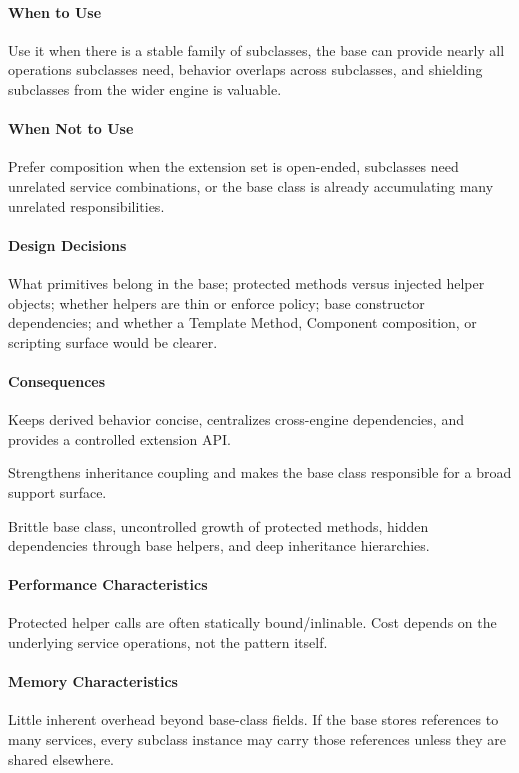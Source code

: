 \documentclass[11pt]{article}
\begin{document}
\paragraph{When to Use} Use it when there is a stable family of subclasses, the base can provide nearly all operations subclasses need, behavior overlaps across subclasses, and shielding subclasses from the wider engine is valuable.
\paragraph{When Not to Use} Prefer composition when the extension set is open-ended, subclasses need unrelated service combinations, or the base class is already accumulating many unrelated responsibilities.
\paragraph{Design Decisions} What primitives belong in the base; protected methods versus injected helper objects; whether helpers are thin or enforce policy; base constructor dependencies; and whether a Template Method, Component composition, or scripting surface would be clearer.
\paragraph{Consequences}
\begin{description}[leftmargin=2.7cm,style=nextline]
\item[Benefits] Keeps derived behavior concise, centralizes cross-engine dependencies, and provides a controlled extension API.
\item[Costs] Strengthens inheritance coupling and makes the base class responsible for a broad support surface.
\item[Risks] Brittle base class, uncontrolled growth of protected methods, hidden dependencies through base helpers, and deep inheritance hierarchies.
\end{description}
\paragraph{Performance Characteristics} Protected helper calls are often statically bound/inlinable. Cost depends on the underlying service operations, not the pattern itself.
\paragraph{Memory Characteristics} Little inherent overhead beyond base-class fields. If the base stores references to many services, every subclass instance may carry those references unless they are shared elsewhere.
\end{document}
